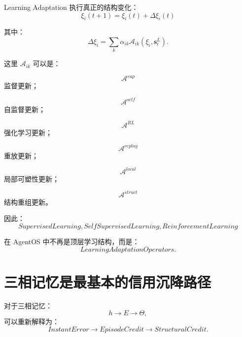Learning Adaptation 执行真正的结构变化：
\begin{equation}
\boxed{
\xi_i(t+1)
=
\xi_i(t)
+
\Delta\xi_i(t)
}
\end{equation}

其中：
\begin{equation}
\Delta\xi_i
=
\sum_k
\alpha_{ik}
\mathcal{A}_{ik}
(
\xi_i,\mathbf{s}_t^L
).
\end{equation}

这里 $\mathcal{A}_{ik}$ 可以是：

\begin{equation}
\mathcal{A}^{sup}
\end{equation}
监督更新；

\begin{equation}
\mathcal{A}^{self}
\end{equation}
自监督更新；

\begin{equation}
\mathcal{A}^{RL}
\end{equation}
强化学习更新；

\begin{equation}
\mathcal{A}^{replay}
\end{equation}
重放更新；

\begin{equation}
\mathcal{A}^{local}
\end{equation}
局部可塑性更新；

\begin{equation}
\mathcal{A}^{struct}
\end{equation}
结构重组更新。

因此：
\begin{equation}
\boxed{
SupervisedLearning,
SelfSupervisedLearning,
ReinforcementLearning
}
\end{equation}

在 AgentOS 中不再是顶层学习结构，而是：
\begin{equation}
\boxed{
LearningAdaptationOperators.
}
\end{equation}


\section{三相记忆是最基本的信用沉降路径}

对于三相记忆：
\begin{equation}
h
\rightarrow
E
\rightarrow
\Theta,
\end{equation}
可以重新解释为：
\begin{equation}
\boxed{
InstantError
\rightarrow
EpisodeCredit
\rightarrow
StructuralCredit.
}
\end{equation}

